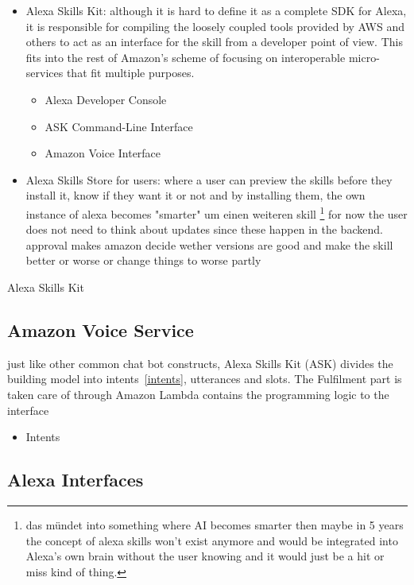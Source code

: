 \begin{itemize}
	\item Alexa Skills Kit: although it is hard to define it as a complete SDK for Alexa, it is responsible for compiling the loosely coupled tools provided by AWS and others to act as an interface for the skill from a developer point of view. This fits into the rest of Amazon's scheme of focusing on interoperable micro-services that fit multiple purposes.
	
	
	\begin{itemize}
		\item Alexa Developer Console
		\item ASK Command-Line Interface 
		\item Amazon Voice Interface
	\end{itemize}
	\item Alexa Skills Store for users: where a user can preview the skills before they install it, know if they want it or not and by installing them, the own instance of alexa becomes "smarter" um einen weiteren skill \footnote{das mündet into something where AI becomes smarter then maybe in 5 years the concept of alexa skills won't exist anymore and would be integrated into Alexa's own brain without the user knowing and it would just be a hit or miss kind of thing.} for now the user does not need to think about updates since these happen in the backend. approval makes amazon decide wether versions are good and make the skill better or worse or change things to worse partly
\end{itemize}
Alexa Skills Kit  




\subsection{Amazon Voice Service}
just like other common chat bot constructs, Alexa Skills Kit (ASK) divides the building model into intents~\ref{intents}, utterances and slots. The Fulfilment part is taken care of through Amazon Lambda contains the programming  logic to the interface
\begin{itemize}
	\item Intents
	\
\end{itemize}


\subsection*{Alexa Interfaces}

